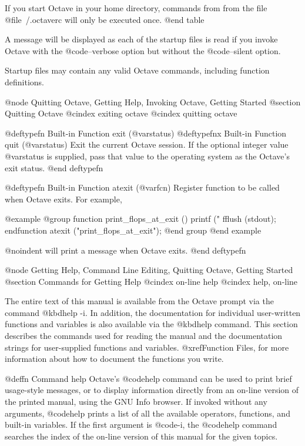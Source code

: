 If you start Octave in your home directory, commands from from the file
@file{~/.octaverc} will only be executed once.
@end table

A message will be displayed as each of the startup files is read if you
invoke Octave with the @code{--verbose} option but without the
@code{--silent} option.

Startup files may contain any valid Octave commands, including function
definitions.

@node Quitting Octave, Getting Help, Invoking Octave, Getting Started
@section Quitting Octave
@cindex exiting octave
@cindex quitting octave

@deftypefn {Built-in Function} {} exit (@var{status})
@deftypefnx {Built-in Function} {} quit (@var{status})
Exit the current Octave session.  If the optional integer value
@var{status} is supplied, pass that value to the operating system as the
Octave's exit status.
@end deftypefn

@deftypefn {Built-in Function} {} atexit (@var{fcn})
Register function to be called when Octave exits.  For example,

@example
@group
function print_flops_at_exit ()
  printf ("\n%
  fflush (stdout);
endfunction
atexit ("print_flops_at_exit");
@end group
@end example

@noindent
will print a message when Octave exits.
@end deftypefn

@node Getting Help, Command Line Editing, Quitting Octave, Getting Started
@section Commands for Getting Help
@cindex on-line help
@cindex help, on-line

The entire text of this manual is available from the Octave prompt
via the command @kbd{help -i}.  In addition, the documentation for
individual user-written functions and variables is also available via
the @kbd{help} command.  This section describes the commands used for
reading the manual and the documentation strings for user-supplied
functions and variables.  @xref{Function Files}, for more information
about how to document the functions you write.

@deffn {Command} help
Octave's @code{help} command can be used to print brief usage-style
messages, or to display information directly from an on-line version of
the printed manual, using the GNU Info browser.  If invoked without any
arguments, @code{help} prints a list of all the available operators,
functions, and built-in variables.  If the first argument is @code{-i},
the @code{help} command searches the index of the on-line version of
this manual for the given topics.

